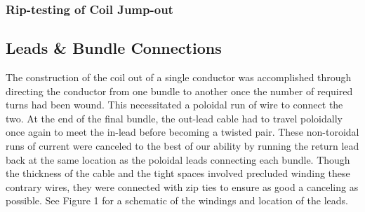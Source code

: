 \subsubsection{Rip-testing of Coil Jump-out}
 
\subsection{Leads \& Bundle Connections} 
The construction of the coil out of a single conductor was accomplished through directing the conductor from one bundle to another once the number of required turns had been wound.  This necessitated a poloidal run of wire to connect the two.  At the end of the final bundle, the out-lead cable had to travel poloidally once again to meet the in-lead before becoming a twisted pair.  These non-toroidal runs of current were canceled to the best of our ability by running the return lead back at the same location as the poloidal leads connecting each bundle.  Though the thickness of the cable and the tight spaces involved precluded winding these contrary wires, they were connected with zip ties to ensure as good a canceling as possible.  See Figure 1 for a schematic of the windings and location of the leads.\\
